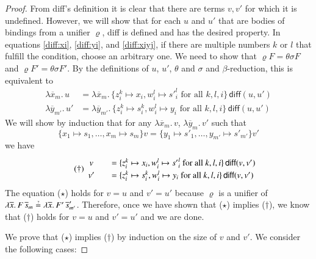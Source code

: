 \begin{proof}
  From \textsf{diff}'s definition it is clear that there are terms $v,v'$ for which it is undefined.
  However, we will show that for each $u$ and $u'$ that are bodies of bindings from a unifier $\varrho$, 
  \textsf{diff} is defined and has the desired property.
  In equations \ref{diff:xi}, \ref{diff:yi}, and \ref{diff:xiyj}, if there are multiple numbers $k$ or $l$
  that fulfill the condition, choose an arbitrary one.
  We need to show that $\varrho F = \theta\sigma F$ and $\varrho F' = \theta\sigma F'$.
  By the definitions of $u$, $u'$, $\theta$ and $\sigma$ and $\beta$-reduction, this is equivalent to
  \begin{align*}
    \lambda \overline{x}_m.\, u &= \lambda \overline{x}_m.\,
    \{z_i^k \mapsto x_i, w_i^l \mapsto {s'}_i^l \text{ for all }k,l,i\}\,\textsf{diff}(u,u')\\
    \lambda \overline{y}_{m'}.\, u' &= \lambda \overline{y}_{m'}.\,
    \{z_i^k \mapsto s_i^k, w_i^l \mapsto y_i \text{ for all }k,l,i\}\,\textsf{diff}(u,u')
  \end{align*}
  We will show by induction that for any $\lambda \overline{x}_m.\, v$, $\lambda \overline{y}_m.\, v'$ such that 
  \[\{x_1 \mapsto s_1, \ldots, x_m \mapsto  s_m\} v = \{y_1 \mapsto s'_1, \ldots, y_{m'} \mapsto  s'_{m'}\} v' \tag{$\star$}\]
  we have
  \begin{align*}
    \tag{\textdagger}
    \renewcommand{\arraystretch}{1.2}%
    \begin{array}{c@{\qquad}l}
      v &=
      \{z_i^k \mapsto x_i, w_i^l \mapsto {s'}_i^l \text{ for all }k,l,i\}\,\textsf{diff}(v,v')\\
      v' &=
      \{z_i^k \mapsto s_i^k, w_i^l \mapsto y_i \text{ for all }k,l,i\}\,\textsf{diff}(v,v')
    \end{array}
  \end{align*}
  The equation ($\star$) holds for $v = u$ and $v' = u'$ because
  $\varrho$ is a unifier of
  $\lambda
  \overline{x}.\, F \, \overline{s}_m \unif \lambda\overline{x}.\, F' \,
  \overline{s}'_{m'}$.
  Therefore, once we have shown that ($\star$) implies ($\dagger$),
  we know that ($\dagger$) holds for $v = u$ and $v' = u'$ and we are done.
  
  We prove that ($\star$) implies ($\dagger$) by induction on the size of $v$ and $v'$. We consider
  the following cases: 


\end{proof}
